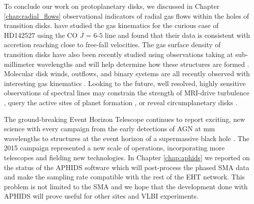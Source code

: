 To conclude our work on protoplanetary disks, we discussed in Chapter \ref{chap:radial_flows} observational 
indicators of 
radial gas flows within the holes of transition disks.  \citet{casassus15} have studied the gas kinematics for
the curious case of HD142527 using the CO $J$ = $6$-$5$ line and found that their data is consistent with
accretion reaching close to free-fall velocities.  The gas surface density of transition disks have also 
been recently studied using observations taking at sub-millimeter wavelengths 
\citep{bruderer14,zhang14,canovas15,perez15,vandermarel15} and will help determine how these structures are formed
\citep{bruderer13}.  Molecular disk winds, outflows, and binary systems are all recently observed 
with interesting gas kinematics \citep{klaassen13,dutrey14,williams14,salyk14,czekala15}.  Looking to the 
future, well resolved, highly sensitive observations of spectral lines may constrain the strength of MRI-drive
turbulence \citep{simon15}, query the active sites of planet formation \citep{cleeves15,ober15}, or reveal
circumplanetary disks \citep{perez15}.

The ground-breaking Event Horizon Telescope continues to report exciting, new science with every
campaign from the early detections of AGN at mm wavelengths \citep{doeleman05} to structures
at the event horizon of a supermassive black hole \citep{doeleman08,doeleman12}.
The 2015 campaign represented a new scale of operations, incorporating more telescopes and
fielding new technologies.  In Chapter \ref{chap:aphids} we reported on the status of the APHIDS software which
will post-process the phased SMA data and make the sampling rate compatible with the rest of the EHT
network.  This problem is not limited to the SMA and we hope that the development done with APHIDS will
prove useful for other sites and VLBI experiments. 
